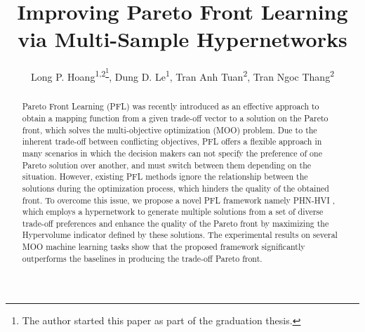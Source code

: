 \documentclass[letterpaper]{article} %
\title{Improving Pareto Front Learning via Multi-Sample Hypernetworks}
\author {
    Long P. Hoang\textsuperscript{\rm 1,\rm 2\footnote{The author started this paper as part of the graduation thesis.}},
    Dung D. Le\textsuperscript{\rm 1},
    Tran Anh Tuan\textsuperscript{\rm 2},
    Tran Ngoc Thang\textsuperscript{\rm 2}
}
\newcommand{\ourmodel}{PHN-HVI }
\begin{document}
\maketitle


\begin{abstract}
 Pareto Front Learning (PFL) was recently introduced as an effective approach to obtain a mapping function from a given trade-off vector to a solution on the Pareto front, which solves the multi-objective optimization (MOO) problem. Due to the inherent trade-off between conflicting objectives, PFL offers a flexible approach in many scenarios in which the decision makers can not specify the preference of one Pareto solution over another, and must switch between them depending on the situation. However, existing PFL methods ignore the relationship between the solutions during the optimization process, which hinders the quality of the obtained front. To overcome this issue, we propose a novel PFL framework namely \ourmodel, which employs a hypernetwork to generate multiple solutions from a set of diverse trade-off preferences and enhance the quality of the Pareto front by maximizing the Hypervolume indicator defined by these solutions. The experimental results on several MOO machine learning tasks show that the proposed framework significantly outperforms the baselines in producing the trade-off Pareto front.
\end{abstract}
\end{document}
